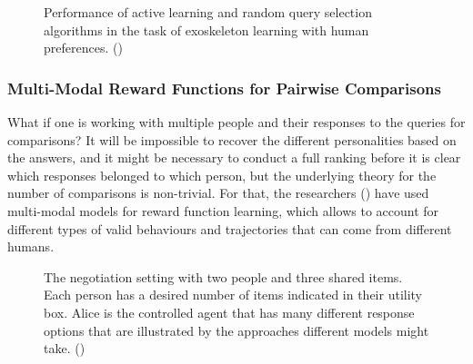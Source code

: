 \documentclass[
  letterpaper,
  numbers=noenddot,
  DIV=11]{scrreprt}
\theoremstyle{plain}
\theoremstyle{definition}
\theoremstyle{plain}
\theoremstyle{remark}
\begin{document}
\begin{figure}


\caption{\label{fig-robotics}Performance of active learning and random
query selection algorithms in the task of exoskeleton learning with
human preferences. ()}

\end{figure}%

\subsubsection*{Multi-Modal Reward Functions for Pairwise
Comparisons}\label{multi-modal-reward-functions-for-pairwise-comparisons}

What if one is working with multiple people and their responses to the
queries for comparisons? It will be impossible to recover the different
personalities based on the answers, and it might be necessary to conduct
a full ranking before it is clear which responses belonged to which
person, but the underlying theory for the number of comparisons is
non-trivial. For that, the researchers
() have used
multi-modal models for reward function learning, which allows to account
for different types of valid behaviours and trajectories that can come
from different humans.

\begin{figure}


\caption{\label{fig-negotiation}The negotiation setting with two people
and three shared items. Each person has a desired number of items
indicated in their utility box. Alice is the controlled agent that has
many different response options that are illustrated by the approaches
different models might take. ()}

\end{figure}%
\end{document}
